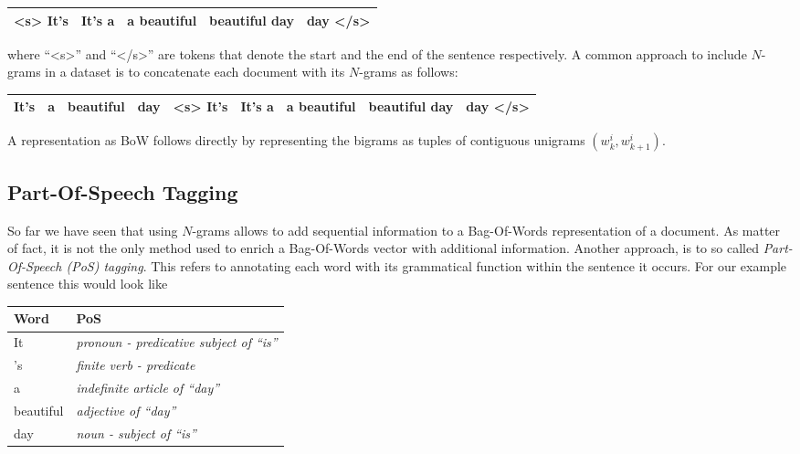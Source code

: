 \begin{center}
\begin{tabular}{|c|c|c|c|c|}
\hline 
<s> It's & It's a & a beautiful & beautiful day & day </s> \\
\hline
\end{tabular}
\end{center}

where ``<s>'' and ``</s>'' are tokens that denote the start and the end of the
sentence respectively. A common approach to include $N$-grams in a dataset is to
concatenate each document with its $N$-grams as follows: 

\begin{center}
\begin{tabular}{|c|c|c|c|c|c|c|c|c|}
\hline 
It's & a & beautiful & day & <s> It's & It's a & a beautiful & beautiful day &
 
day </s> \\
\hline
\end{tabular}
\end{center}

A representation as BoW follows directly by representing the bigrams as
tuples of contiguous unigrams $(w_k^i, w_{k+1}^i)$. 

 
\subsection{Part-Of-Speech Tagging}
So far we have seen that using $N$-grams allows to add sequential information to a Bag-Of-Words representation of a document. 
As matter of fact, it is not the only method used to enrich a Bag-Of-Words
vector with additional information. Another approach, is to so called
\emph{Part-Of-Speech (PoS) tagging}. This refers to annotating each word with
its grammatical function within the sentence it occurs. For our example sentence this would
 look like

\begin{center}
\begin{tabular}{|l|l|}
\hline
\textbf{Word} & \textbf{PoS} \\
\hline 
It 		  & \emph{pronoun - predicative subject of ``is''} \\
's 		  & \emph{finite verb - predicate} \\ 
a 		  & \emph{indefinite article of ``day''}  \\
beautiful & \emph{adjective of ``day''} \\
day		  & \emph{noun - subject of ``is''} \\
\hline
\end{tabular}
\end{center}

